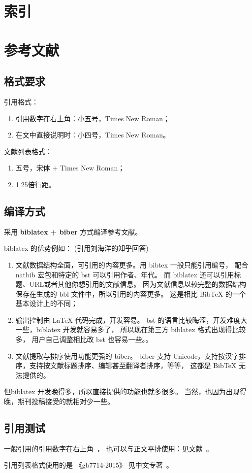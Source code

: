 \section{索引}


\section{参考文献}

\subsection{格式要求}

引用格式：

\begin{enumerate}
	\item 引用数字在右上角：小五号，Times New Roman；
	\item 在文中直接说明时：小四号，Times New Roman。
\end{enumerate}

文献列表格式：

\begin{enumerate}
	\item 五号，宋体 + Times New Roman；
	\item 1.25倍行距。
\end{enumerate}

\subsection{编译方式}

采用 \textbf{biblatex + biber} 方式编译参考文献。

biblatex 的优势例如： (引用刘海洋的知乎回答)

\begin{enumerate}
	\item 文献数据结构全面，可引用的内容更多。用 bibtex 一般只能引用编号，
				配合 natbib 宏包和特定的 bst 可以引用作者、年代。
				而 biblatex 还可以引用标题、URL或者其他你想引用的文献信息。
				因为文献信息以较完整的数据结构保存在生成的 bbl 文件中，所以引用的内容更多。
				这是相比 BibTeX 的一个基本设计上的不同；
	\item 输出控制由 LaTeX 代码完成，开发容易。
				bst 的语言比较晦涩，开发难度大一些，biblatex 开发就容易多了，
				所以现在第三方 biblatex 格式出现得比较多，
				用户自己调整相比改 bst 也容易一些。。
	\item 文献提取与排序使用功能更强的 biber。
				biber 支持 Unicode，支持按汉字排序，支持按文献标题排序、编辑甚至翻译者排序，等等，
				这都是 BibTeX 无法提供的。
\end{enumerate}

但biblatex 开发晚得多，所以直接提供的功能也就多很多。
当然，也因为出现得晚，期刊投稿接受的就相对少一些。

\subsection{引用测试}

一般引用的引用数字在右上角~\cite{knuth1984}，
也可以与正文平排使用：见文献~\parencite{knuth1986}。

引用列表格式使用的是 《gb7714-2015》
见中文专著~\cite{liu2013}。
